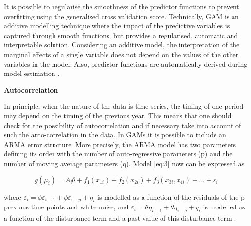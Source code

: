 



It is possible to regularise the smoothness of the predictor functions to prevent overfitting using the generalized cross validation score. Technically, GAM is an additive modelling technique where the impact of the predictive variables is captured through smooth functions, but provides a regularised, automatic and interpretable solution. Considering an additive model, the interpretation of the marginal effects of a single variable does not depend on the values of the other variables in the model. Also, predictor functions are automatically derived during model estimation \citep{larsen_2015}. 





\textbf{Autocorrelation} %

In principle, when the nature of the data is time series, the timing of one period may depend on the timing of the previous year. This means that one should check for the possibility of autocorrelation and if necessary take into account of such the auto-correlation in the data. In GAMs it is possible to include an ARMA error structure. More precisely, the ARMA model has two parameters defining its order with the number of auto-regressive parameters (p) and the number of moving average parameters (q). Model \ref{eq:3} now can be expressed as


\begin{equation}  \label{eq:8} 
g(\mu_{i}) = A_{i} \theta + f_{1}(x_{1i}) + f_{2}(x_{2i}) + f_{3}(x_{3i},x_{4i}) + \dots + \varepsilon_{i}
\end{equation}

where $\varepsilon_{i} = {\phi}\varepsilon_{i-1} + {\phi}\varepsilon_{i-p} + \eta_{i} $ is modelled as a function of the residuals of the p previous time points and white noise, and $\varepsilon_{i} = {\theta}\eta_{i-1} + {\theta}\eta_{i-q} + \eta_{i}$ is modelled as a function of the disturbance term and a past value of this disturbance term \citep{zuur_saveliev_ieno_2014}.

